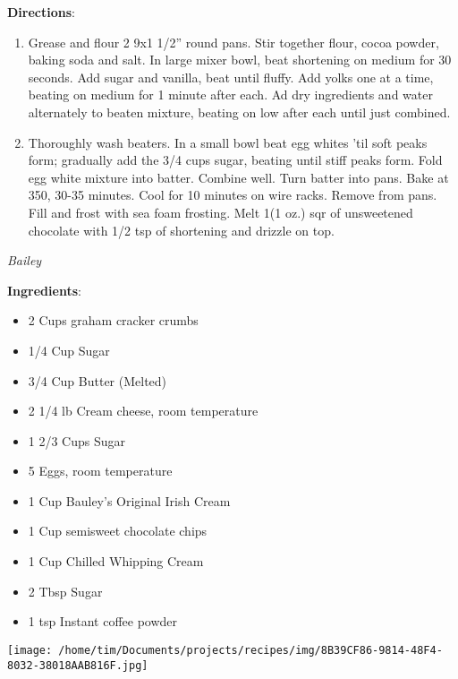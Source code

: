 \documentclass[11pt, twoside, openany]{book}
\begin{document}
\textbf{Directions}:
\vspace{-3mm}\begin{enumerate}\setlength\itemsep{-1mm}
\item Grease and flour 2 9x1 1/2'' round pans. Stir together flour, cocoa powder, baking soda and salt. In large mixer bowl, beat shortening on medium for 30 seconds. Add sugar and vanilla, beat until fluffy. Add yolks one at a time, beating on medium for 1 minute after each. Ad dry ingredients and water alternately to beaten mixture, beating on low after each until just combined.
\item Thoroughly wash beaters. In a small bowl beat egg whites 'til soft peaks form; gradually add the 3/4 cups sugar, beating until stiff peaks form. Fold egg white mixture into batter. Combine well. Turn batter into pans. Bake at 350, 30-35 minutes. Cool for 10 minutes on wire racks. Remove from pans. Fill and frost with sea foam frosting. Melt 1(1 oz.) sqr of unsweetened chocolate with 1/2 tsp of shortening and drizzle on top.
\end{enumerate}
 \label{bailey's-chocolate-chip-cheesecake}\hfill\textit{Bailey}\\
\begin{minipage}[t]{0.8\linewidth}
\textbf{Ingredients}:\vspace{-3mm}
\begin{multicols}{2}
\begin{itemize}\setlength\itemsep{-1mm}
\item 2 Cups graham cracker crumbs
\item 1/4 Cup Sugar
\item 3/4 Cup Butter (Melted)
\item 2 1/4 lb Cream cheese, room temperature
\item 1 2/3 Cups Sugar
\item 5 Eggs, room temperature
\item 1 Cup Bauley's Original Irish Cream
\item 1 Cup semisweet chocolate chips
\item 1 Cup Chilled Whipping Cream
\item 2 Tbsp Sugar
\item 1 tsp Instant coffee powder
\end{itemize}
\end{multicols}
\end{minipage}
\begin{minipage}[t]{0.2\linewidth}
\centering \strut\vspace*{-\baselineskip}\newline
\texttt{[image: /home/tim/Documents/projects/recipes/img/8B39CF86-9814-48F4-8032-38018AAB816F.jpg]}\\
\end{minipage}\vspace{3mm}
\end{document}
